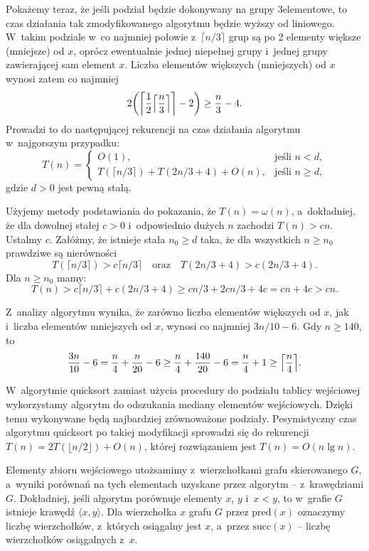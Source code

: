 Pokażemy teraz, że jeśli podział będzie dokonywany na grupy 3\nbhyphen elementowe, to czas działania tak zmodyfikowanego algorytmu  będzie wyższy od liniowego.
W~takim podziale w~co najmniej połowie z~$\lceil n/3\rceil$ grup są po 2 elementy większe (mniejsze) od $x$, oprócz ewentualnie jednej niepełnej grupy i~jednej grupy zawierającej sam element $x$.
Liczba elementów większych (mniejszych) od $x$ wynosi zatem co najmniej
\[
	2\biggl(\biggl\lceil\frac{1}{2}\Bigl\lceil\frac{n}{3}\Bigr\rceil\biggr\rceil-2\biggr) \ge \frac{n}{3}-4.
\]
Prowadzi to do następującej rekurencji na czas działania algorytmu w~najgorszym przypadku:
\[
	T(n) = \begin{cases}
		O(1), & \text{jeśli $n<d$}, \\
		T(\lceil n/3\rceil)+T(2n/3+4)+O(n), & \text{jeśli $n\ge d$},
	\end{cases}
\]
gdzie $d>0$ jest pewną stałą.

Użyjemy metody podstawiania do pokazania, że $T(n)=\omega(n)$, a~dokładniej, że dla dowolnej stałej $c>0$ i~odpowiednio dużych $n$ zachodzi $T(n)>cn$.
Ustalmy $c$.
Załóżmy, że istnieje stała $n_0\ge d$ taka, że dla wszystkich $n\ge n_0$ prawdziwe są nierówności
\[
	T(\lceil n/3\rceil) > c\lceil n/3\rceil \quad\text{oraz}\quad T(2n/3+4) > c(2n/3+4).
\]
Dla $n\ge n_0$ mamy:
\[
	T(n) > c\lceil n/3\rceil+c(2n/3+4) \ge cn/3+2cn/3+4c = cn+4c > cn.
\]

\exercise %
Z~analizy algorytmu  wynika, że zarówno liczba elementów większych od $x$, jak i~liczba elementów mniejszych od $x$, wynosi co najmniej $3n/10-6$.
Gdy $n\ge140$, to
\[
	\frac{3n}{10}-6 = \frac{n}{4}+\frac{n}{20}-6 \ge \frac{n}{4}+\frac{140}{20}-6 = \frac{n}{4}+1 \ge \Bigl\lceil\frac{n}{4}\Bigr\rceil.
\]

\exercise %

\noindent W~algorytmie quicksort zamiast użycia procedury  do podziału tablicy wejściowej wykorzystamy algorytm  do odszukania mediany elementów wejściowych.
Dzięki temu wykonywane będą najbardziej zrównoważone podziały.
Pesymistyczny czas algorytmu quicksort po takiej modyfikacji sprowadzi się do rekurencji $T(n)=2T(\lfloor n/2\rfloor)+O(n)$, której rozwiązaniem jest $T(n)=O(n\lg n)$.

\exercise %
Elementy zbioru wejściowego utożsamimy z~wierzchołkami grafu skierowanego $G$, a~wyniki porównań na tych elementach uzyskane przez algorytm -- z~krawędziami $G$.
Dokładniej, jeśli algorytm porównuje elementy $x$, $y$ i~$x<y$, to w~grafie $G$ istnieje krawędź $\langle x,y\rangle$.
Dla wierzchołka $x$ grafu $G$ przez $\mathrm{pred}(x)$ oznaczymy liczbę wierzchołków, z~których osiągalny jest $x$, a~przez $\mathrm{succ}(x)$ -- liczbę wierzchołków osiągalnych z~$x$.


